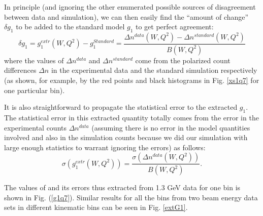 



In principle (and ignoring the other enumerated possible sources of disagreement between data and simulation), we can then easily find the ``amount of change'' $\delta g_1$ to be added to the standard model $g_1$ to get perfect agreement:
\begin{equation}
\label{g1Ext}
\delta g_1 = g_1^{extr}(W,Q^2) - g_1^{Standard} = \frac{\Delta n^{data}(W,Q^2) - \Delta n^{standard}(W,Q^2)}{B(W,Q^2) }
\end{equation}
where the values of $\Delta n^{data}$ and $\Delta n^{standard}$ come from the polarized count differences $\Delta n$ in the experimental data and the standard simulation respectively (as shown, for example, by the red points and black histograms in Fig. \ref{xs1q7} for one particular \qsqs bin). %

It is also straightforward to propagate the statistical error to the extracted $g_1$. 
The statistical error in this extracted quantity totally comes from the error in the experimental counts $\Delta n^{data}$ (assuming there is no error in the model quantities involved and also in the simulation counts because we did our simulation with large enough statistics to warrant ignoring the errors) as follows:
\begin{equation}
\label{g1ExtEr}
\sigma (g_1^{extr}(W,Q^2)) = \frac{\sigma(\Delta n^{data}(W,Q^2))}{B(W,Q^2) } .
\end{equation}

The values of \gones and its errors thus extracted from 1.3 GeV data for one \qsqs bin is shown in Fig. (\ref{g1q7}). Similar results for all the bins from two beam energy data sets in different kinematic bins can be seen in Fig. \ref{extG1}.%




